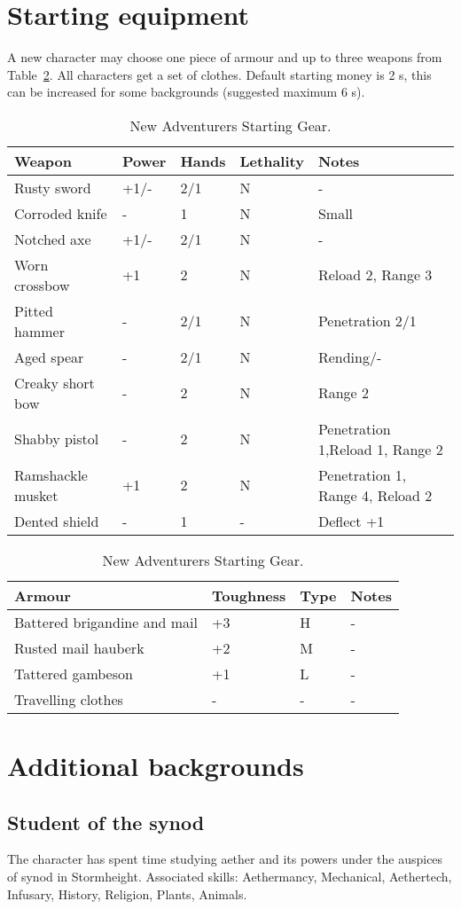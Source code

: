 \documentclass[a4paper,11pt,oneside]{book}
\begin{document}
\section{Starting equipment}
A new character may choose one piece of armour and up to three weapons from Table~\ref{tab:start-gear}. All characters get a set of clothes. Default starting money is 2 s, this can be increased for some backgrounds (suggested maximum 6 s).
\begin{table}[ht!]
	\centering
	\caption{New Adventurers Starting Gear.}
	\label{tab:start-gear}
	\begin{tabular}{|l|l|l|l|l|}
		\hline
		Weapon & Power & Hands &  Lethality & Notes\\
		\hline
		Rusty sword & +1/- & 2/1 & N & -\\
		Corroded knife & - & 1 & N & Small\\
		Notched axe & +1/- & 2/1 & N & -\\
		Worn crossbow & +1 & 2 & N & Reload 2, Range 3\\
		Pitted hammer & - & 2/1 & N & Penetration 2/1 \\
		Aged spear & - & 2/1 & N & Rending/-\\
		Creaky short bow & - & 2 & N & Range 2\\
		Shabby pistol & - & 2 & N & Penetration 1,Reload 1, Range 2 \\
		Ramshackle musket & +1 & 2 & N & Penetration 1, Range 4, Reload 2 \\
		Dented shield & - & 1 & - & Deflect +1 \\
		\hline
	\end{tabular}
	\begin{tabular}{|l|l|l|l|}	
		\hline
		Armour & Toughness & Type & Notes\\
		\hline
		Battered brigandine and mail & +3 & H & - \\
		Rusted mail hauberk & +2 & M & - \\
		Tattered gambeson & +1 & L & - \\
		Travelling clothes & - & - & - \\
		\hline
	\end{tabular}
\end{table}


\section{Additional backgrounds}

\subsection{Student of the synod}
The character has spent time studying aether and its powers under the auspices of synod in Stormheight. Associated skills: Aethermancy, Mechanical, Aethertech, Infusary, History, Religion, Plants, Animals.
\end{document}
